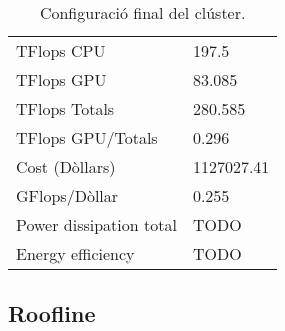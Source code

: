 \begin{table}[H]
\begin{adjustwidth}{-1.0in}{-1.0in}
\begin{center}
\begin{tabular}{l|l}
{\cellcolor[HTML]{EFEFEF}TFlops CPU}                & {\cellcolor[HTML]{EFEFEF}197.5}                    \\
{\color[HTML]{000000}TFlops GPU}                & {\color[HTML]{000000}83.085}                    \\ 
{\cellcolor[HTML]{EFEFEF}TFlops Totals}             & {\cellcolor[HTML]{EFEFEF}280.585}                   \\ 
{\color[HTML]{000000}TFlops GPU/Totals}         & {\color[HTML]{000000} 0.296}                    \\ 
{\cellcolor[HTML]{EFEFEF}Cost (Dòllars)}                 & {\cellcolor[HTML]{EFEFEF}1127027.41}              \\
{\color[HTML]{000000}GFlops/Dòllar}               & {\color[HTML]{000000}0.255}                    \\
    \rowcolor[HTML]{EFEFEF}
Power dissipation total & TODO \\
    Energy efficiency & TODO \\ \hline
\end{tabular}
\caption{Configuració final del clúster.}
\end{center}
\end{adjustwidth}
\end{table}




\subsection{Roofline}


